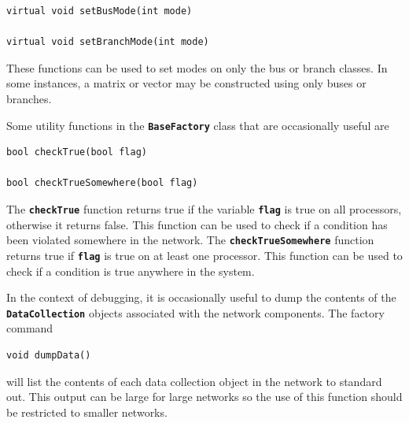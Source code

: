 {
\color{red}
\begin{Verbatim}[fontseries=b]
virtual void setBusMode(int mode)

virtual void setBranchMode(int mode)
\end{Verbatim}
}

These functions can be used to set modes on only the bus or branch classes. In
some instances, a matrix or vector may be constructed using only buses or
branches.

Some utility functions in the \texttt{\textbf{BaseFactory}} class that are occasionally useful are

{
\color{red}
\begin{Verbatim}[fontseries=b]
bool checkTrue(bool flag)

bool checkTrueSomewhere(bool flag)
\end{Verbatim}
}

The \texttt{\textbf{checkTrue}} function returns true if the variable \texttt{\textbf{flag}} is true on all processors, otherwise it returns false. This function can be used to check if a condition has been violated somewhere in the network. The \texttt{\textbf{checkTrueSomewhere}} function returns true if \texttt{\textbf{flag}} is true on at least one processor. This function can be used to check if a condition is true anywhere in the system.

In the context of debugging, it is occasionally useful to dump the contents of
the \texttt{\textbf{DataCollection}} objects associated with the network
components. The factory command

{
\color{red}
\begin{Verbatim}[fontseries=b]
void dumpData()
\end{Verbatim}
}

will list the contents of each data collection object in the network to standard
out. This output can be large for large networks so the use of this function
should be restricted to smaller networks.
\newline
\hyperlink{topDoc}{\color{blue}{Top}}
